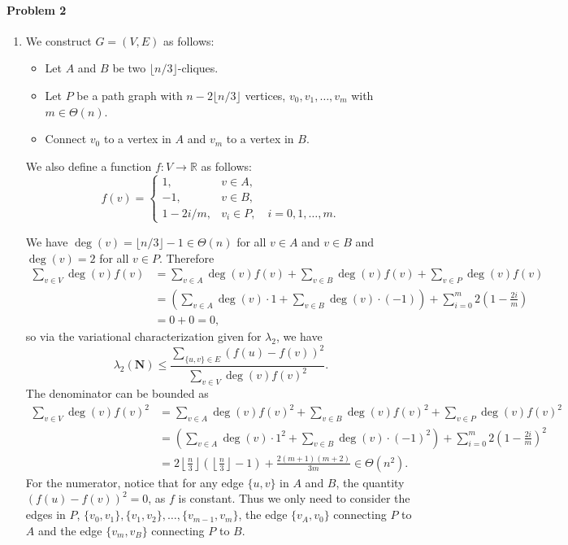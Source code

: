 \documentclass[12pt]{article}
\begin{document}
\paragraph{Problem 2}
\begin{enumerate}[label=\alph*., font=\bfseries]
\item We construct $G=(V, E)$ as follows:
\begin{itemize}
    \item Let $A$ and $B$ be two $\lfloor n/3\rfloor$-cliques.
    \item Let $P$ be a path graph with $n-2\lfloor n/3\rfloor$ vertices, $v_0, v_1,\dots,v_m$ with $m\in\Theta(n)$.
    \item Connect $v_0$ to a vertex in $A$ and $v_m$ to a vertex in $B$.
\end{itemize}
We also define a function $f:V\to\mathbb{R}$ as follows:
\[
f(v)=
\begin{cases}
1, &v\in A,\\
-1, &v\in B,\\
1-2i/m, &v_i\in P,\quad i=0,1,\dots,m.
\end{cases}
\]

We have $\deg(v)=\lfloor n/3\rfloor-1\in\Theta(n)$ for all $v\in A$ and $v\in B$ and $\deg(v)=2$ for all $v\in P$. Therefore
\begin{align*}
    \sum_{v\in V}\deg(v)f(v)&=\sum_{v\in A}\deg(v)f(v)+\sum_{v\in B}\deg(v)f(v)+\sum_{v\in P}\deg(v)f(v)\\
    &=\left(\sum_{v\in A}\deg(v)\cdot 1+\sum_{v\in B}\deg(v)\cdot(-1)\right)+\sum_{i=0}^m 2\left(1-\frac{2i}{m}\right)\\
    &= 0+0=0,
\end{align*}
so via the variational characterization given for $\lambda_2$, we have
$$\lambda_2(\mathbf{N})\le\frac{\sum_{\{u,v\}\in E}\left(f(u)-f(v)\right)^2}{\sum_{v\in V}\deg(v)f(v)^2}.$$
The denominator can be bounded as
\begin{align*}
    \sum_{v\in V}\deg(v)f(v)^2&=\sum_{v\in A}\deg(v)f(v)^2+\sum_{v\in B}\deg(v)f(v)^2+\sum_{v\in P}\deg(v)f(v)^2\\
    &=\left(\sum_{v\in A}\deg(v)\cdot 1^2+\sum_{v\in B}\deg(v)\cdot(-1)^2\right)+\sum_{i=0}^m 2\left(1-\frac{2i}{m}\right)^2\\
    &=2\left\lfloor\frac{n}{3}\right\rfloor\left(\left\lfloor\frac{n}{3}\right\rfloor-1\right)+\frac{2(m+1)(m+2)}{3m}\in\Theta\left(n^2\right).
\end{align*}
For the numerator, notice that for any edge $\{u,v\}$ in $A$ and $B$, the quantity $\left(f(u)-f(v)\right)^2=0$, as $f$ is constant. Thus we only need to consider the edges in $P$, $\{v_0,v_1\},\{v_1,v_2\},\dots,\{v_{m-1},v_m\}$, the edge $\{v_A,v_0\}$ connecting $P$ to $A$ and the edge $\{v_m,v_B\}$ connecting $P$ to $B$.


\end{enumerate}
\end{document}
